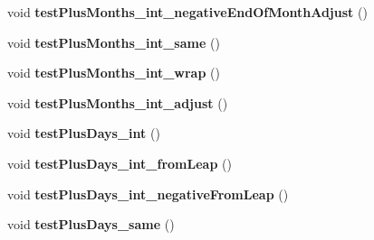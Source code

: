 \begin{DoxyCompactItemize}
\item 
\hypertarget{classorg_1_1joda_1_1time_1_1_test_month_day___basics_a87e811307b3700f133d363c2e88dd175}{void {\bfseries test\-Plus\-Months\-\_\-int\-\_\-negative\-End\-Of\-Month\-Adjust} ()}\label{classorg_1_1joda_1_1time_1_1_test_month_day___basics_a87e811307b3700f133d363c2e88dd175}

\item 
\hypertarget{classorg_1_1joda_1_1time_1_1_test_month_day___basics_ac45efce0232722123452953b994dcfa4}{void {\bfseries test\-Plus\-Months\-\_\-int\-\_\-same} ()}\label{classorg_1_1joda_1_1time_1_1_test_month_day___basics_ac45efce0232722123452953b994dcfa4}

\item 
\hypertarget{classorg_1_1joda_1_1time_1_1_test_month_day___basics_a4a8d270bd66be20dd3af9932bbd383ed}{void {\bfseries test\-Plus\-Months\-\_\-int\-\_\-wrap} ()}\label{classorg_1_1joda_1_1time_1_1_test_month_day___basics_a4a8d270bd66be20dd3af9932bbd383ed}

\item 
\hypertarget{classorg_1_1joda_1_1time_1_1_test_month_day___basics_ac28268cbf622ce3a1027789961c5ba29}{void {\bfseries test\-Plus\-Months\-\_\-int\-\_\-adjust} ()}\label{classorg_1_1joda_1_1time_1_1_test_month_day___basics_ac28268cbf622ce3a1027789961c5ba29}

\item 
\hypertarget{classorg_1_1joda_1_1time_1_1_test_month_day___basics_a6d73a63f2e49b2f6934db5b1a4645a50}{void {\bfseries test\-Plus\-Days\-\_\-int} ()}\label{classorg_1_1joda_1_1time_1_1_test_month_day___basics_a6d73a63f2e49b2f6934db5b1a4645a50}

\item 
\hypertarget{classorg_1_1joda_1_1time_1_1_test_month_day___basics_ac660bea8b5f5e6373ff71de36fd402fa}{void {\bfseries test\-Plus\-Days\-\_\-int\-\_\-from\-Leap} ()}\label{classorg_1_1joda_1_1time_1_1_test_month_day___basics_ac660bea8b5f5e6373ff71de36fd402fa}

\item 
\hypertarget{classorg_1_1joda_1_1time_1_1_test_month_day___basics_a8ff154c62330586a75ed94c53781fb32}{void {\bfseries test\-Plus\-Days\-\_\-int\-\_\-negative\-From\-Leap} ()}\label{classorg_1_1joda_1_1time_1_1_test_month_day___basics_a8ff154c62330586a75ed94c53781fb32}

\item 
\hypertarget{classorg_1_1joda_1_1time_1_1_test_month_day___basics_a8df8c9ca2fa00b9f662d874c971a922f}{void {\bfseries test\-Plus\-Days\-\_\-same} ()}\label{classorg_1_1joda_1_1time_1_1_test_month_day___basics_a8df8c9ca2fa00b9f662d874c971a922f}


\end{DoxyCompactItemize}
